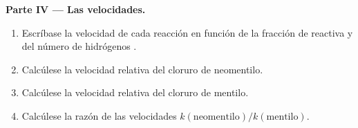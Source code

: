 \begin{problem}
\medskip
\noindent\textbf{Parte IV --- Las velocidades.}
\begin{enumerate}[resume]
  \item Escríbase la velocidad de cada reacción en función de la fracción
        de  reactiva y del número de hidrógenos .
  \item Calcúlese la velocidad relativa del cloruro de neomentilo.
  \item Calcúlese la velocidad relativa del cloruro de mentilo.
  \item Calcúlese la razón de las velocidades
        $k(\text{neomentilo})/k(\text{mentilo})$.
\end{enumerate}
\end{problem}
